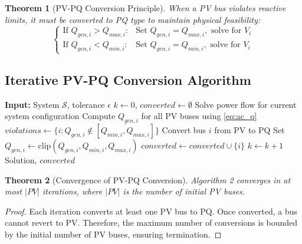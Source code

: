 \documentclass[11pt]{article}
\newtheorem{theorem}{Theorem}
\begin{document}
\begin{theorem}[PV-PQ Conversion Principle]
When a PV bus violates reactive limits, it must be converted to PQ type to maintain physical feasibility:
\begin{equation}
\begin{cases}
\text{If } Q_{gen,i} > Q_{max,i}: & \text{Set } Q_{gen,i} = Q_{max,i}, \text{ solve for } V_i \\
\text{If } Q_{gen,i} < Q_{min,i}: & \text{Set } Q_{gen,i} = Q_{min,i}, \text{ solve for } V_i
\end{cases}
\end{equation}
\end{theorem}

\subsection{Iterative PV-PQ Conversion Algorithm}

\begin{algorithm}
\caption{Adaptive PV-PQ Conversion}
\begin{algorithmic}[1]
\STATE \textbf{Input:} System $\mathcal{S}$, tolerance $\epsilon$
\STATE $k \leftarrow 0$, $converted \leftarrow \emptyset$
\REPEAT
    \STATE Solve power flow for current system configuration
    \STATE Compute $Q_{gen,i}$ for all PV buses using \eqref{eq:ac_q}
    \STATE $violations \leftarrow \{i : Q_{gen,i} \notin [Q_{min,i}, Q_{max,i}]\}$
            \STATE Convert bus $i$ from PV to PQ
            \STATE Set $Q_{gen,i} \leftarrow \text{clip}(Q_{gen,i}, Q_{min,i}, Q_{max,i})$
            \STATE $converted \leftarrow converted \cup \{i\}$
        \ENDFOR
        \STATE $k \leftarrow k + 1$
    \ENDIF
{}
\RETURN Solution, $converted$
\end{algorithmic}
\end{algorithm}

\begin{theorem}[Convergence of PV-PQ Conversion]
Algorithm 2 converges in at most $|PV|$ iterations, where $|PV|$ is the number of initial PV buses.
\end{theorem}

\begin{proof}
Each iteration converts at least one PV bus to PQ. Once converted, a bus cannot revert to PV. Therefore, the maximum number of conversions is bounded by the initial number of PV buses, ensuring termination.
\end{proof}
\end{document}
